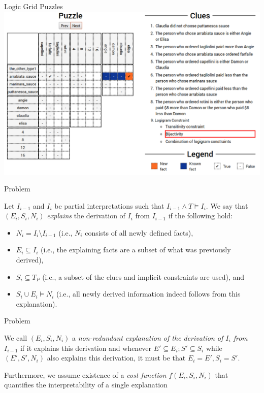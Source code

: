 \documentclass[12pt]{beamer}
\begin{document}
\begin{frame}{Logic Grid Puzzles}\centering
\hspace*{-30pt}\includegraphics[width=1.2\textwidth]{zebra_screen.png} 
 \end{frame}

\begin{frame}{Problem}
 \begin{definition}
 Let $I_{i-1}$ and $I_i$ be partial interpretations such that $I_{i-1}\wedge T \models I_i$.
 We say that $(E_i,S_i,N_i)$ \emph{explains} the derivation of $I_{i}$ from $I_{i-1}$ if the following hold:
\begin{itemize}
    \item $N_i= I_i \setminus I_{i-1}$ (i.e., $N_i$ consists of all newly defined facts), 
	\item $E_i\subseteq I_i$ (i.e., the explaining facts are a subset of what was previously derived),
	\item $S_i \subseteq T_P$ (i.e., a subset of the clues and implicit constraints are used), and 
	\item $S_i \cup E_i \models N_i$ (i.e., all newly derived information indeed follows from this explanation).
\end{itemize}
\end{definition}
\end{frame}

\begin{frame}{Problem}
 \begin{definition}
 We call $(E_i,S_i,N_i)$ a \emph{non-redundant explanation of  the derivation of $I_i$ from $I_{i-1}$} if it explains this derivation and whenever $E'\subseteq E_i; S'\subseteq S_i$ while $(E',S',N_i)$ also explains this derivation, it must be that $E_i=E', S_i=S'$. 
\end{definition}
\pause
Furthermore, we assume existence of a \emph{cost function} $f(E_i,S_i,N_i)$ that quantifies the interpretability of a single explanation
\end{frame}
\end{document}
